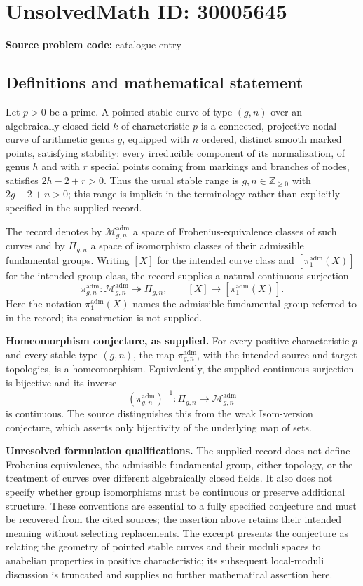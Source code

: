 \documentclass[11pt]{article}
\newcommand{\Z}{\mathbb{Z}}
\begin{document}
\section*{UnsolvedMath ID: 30005645}
\textbf{Source problem code:} catalogue entry
\subsection{Definitions and mathematical statement}
Let \(p>0\) be a prime. A pointed stable curve of type \((g,n)\) over an algebraically closed field \(k\) of characteristic \(p\) is a connected, projective nodal curve of arithmetic genus \(g\), equipped with \(n\) ordered, distinct smooth marked points, satisfying stability: every irreducible component of its normalization, of genus \(h\) and with \(r\) special points coming from markings and branches of nodes, satisfies \(2h-2+r>0\). Thus the usual stable range is \(g,n\in\Z_{\geq 0}\) with \(2g-2+n>0\); this range is implicit in the terminology rather than explicitly specified in the supplied record.

The record denotes by \(\mathcal M_{g,n}^{\mathrm{adm}}\) a space of Frobenius-equivalence classes of such curves and by \(\Pi_{g,n}\) a space of isomorphism classes of their admissible fundamental groups. Writing \([X]\) for the intended curve class and \([\pi_1^{\mathrm{adm}}(X)]\) for the intended group class, the record supplies a natural continuous surjection
\[
\pi_{g,n}^{\mathrm{adm}}:\mathcal M_{g,n}^{\mathrm{adm}}\twoheadrightarrow\Pi_{g,n},\qquad [X]\longmapsto[\pi_1^{\mathrm{adm}}(X)].
\]
Here the notation \(\pi_1^{\mathrm{adm}}(X)\) names the admissible fundamental group referred to in the record; its construction is not supplied.

\textbf{Homeomorphism conjecture, as supplied.} For every positive characteristic \(p\) and every stable type \((g,n)\), the map \(\pi_{g,n}^{\mathrm{adm}}\), with the intended source and target topologies, is a homeomorphism. Equivalently, the supplied continuous surjection is bijective and its inverse
\[
(\pi_{g,n}^{\mathrm{adm}})^{-1}:\Pi_{g,n}\longrightarrow\mathcal M_{g,n}^{\mathrm{adm}}
\]
is continuous. The source distinguishes this from the weak Isom-version conjecture, which asserts only bijectivity of the underlying map of sets.

\textbf{Unresolved formulation qualifications.} The supplied record does not define Frobenius equivalence, the admissible fundamental group, either topology, or the treatment of curves over different algebraically closed fields. It also does not specify whether group isomorphisms must be continuous or preserve additional structure. These conventions are essential to a fully specified conjecture and must be recovered from the cited sources; the assertion above retains their intended meaning without selecting replacements. The excerpt presents the conjecture as relating the geometry of pointed stable curves and their moduli spaces to anabelian properties in positive characteristic; its subsequent local-moduli discussion is truncated and supplies no further mathematical assertion here.
\end{document}
